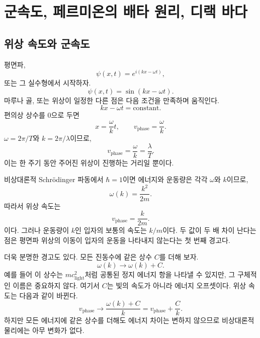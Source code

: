 \chapter{군속도, 페르미온의 배타 원리, 디랙 바다}

\section{위상 속도와 군속도}

\begin{classroomqa}
\end{classroomqa}

평면파,
\begin{equation}
\psi(x,t)=e^{i(kx-\omega t)},
\end{equation}
또는 그 실수형에서 시작하자.
\begin{equation}
\psi(x,t)=\sin(kx-\omega t).
\end{equation}
마루나 골, 또는 위상이 일정한 다른 점은 다음 조건을 만족하며 움직인다.
\begin{equation}
kx-\omega t=\text{constant}.
\end{equation}
편의상 상수를 0으로 두면
\begin{equation}
x=\frac{\omega}{k}t,
\qquad
v_{\mathrm{phase}}=\frac{\omega}{k}.
\end{equation}
\(\omega=2\pi/T\)와 \(k=2\pi/\lambda\)이므로,
\begin{equation}
v_{\mathrm{phase}}=\frac{\omega}{k}=\frac{\lambda}{T}.
\end{equation}
이는 한 주기 동안 주어진 위상이 진행하는 거리일 뿐이다.

비상대론적 Schr\"odinger 파동에서 \(\hbar=1\)이면 에너지와 운동량은 각각 \(\omega\)와 \(k\)이므로,
\begin{equation}
\omega(k)=\frac{k^2}{2m}.
\end{equation}
따라서 위상 속도는
\begin{equation}
v_{\mathrm{phase}}=\frac{k}{2m}.
\end{equation}
이다. 그러나 운동량이 \(k\)인 입자의 보통의 속도는 \(k/m\)이다. 두 값이 두 배 차이 난다는 점은 평면파 위상의 이동이 입자의 운동을 나타내지 않는다는 첫 번째 경고다.

더욱 분명한 경고도 있다. 모든 진동수에 같은 상수 \(C\)를 더해 보자.
\begin{equation}
\omega(k)\longrightarrow \omega(k)+C.
\end{equation}
예를 들어 이 상수는 \(mc_{\mathrm{light}}^2\)처럼 공통된 정지 에너지 항을 나타낼 수 있지만, 그 구체적인 이름은 중요하지 않다. 여기서 \(C\)는 빛의 속도가 아니라 에너지 오프셋이다. 위상 속도는 다음과 같이 바뀐다.
\begin{equation}
v_{\mathrm{phase}}\longrightarrow
\frac{\omega(k)+C}{k}
=v_{\mathrm{phase}}+\frac{C}{k}.
\end{equation}
하지만 모든 에너지에 같은 상수를 더해도 에너지 차이는 변하지 않으므로 비상대론적 물리에는 아무 변화가 없다.

